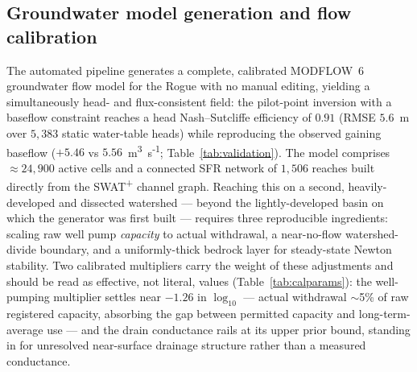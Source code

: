 \subsection{Groundwater model generation and flow calibration}
The automated pipeline generates a complete, calibrated MODFLOW~6 groundwater flow model for the
Rogue with no manual editing, yielding a simultaneously head- and flux-consistent field: the
pilot-point inversion with a baseflow constraint reaches a head Nash--Sutcliffe efficiency of
$\mathbf{0.91}$ (RMSE $5.6$~m over $5{,}383$ static water-table heads) while reproducing the observed
gaining baseflow ($+5.46$ vs $5.56$~m\textsuperscript{3}~s\textsuperscript{-1};
Table~\ref{tab:validation}). The model comprises $\approx 24{,}900$ active cells and a connected SFR
network of $1{,}506$ reaches built directly from the SWAT\textsuperscript{+} channel graph.
Reaching this on a second, heavily-developed and dissected watershed --- beyond the
lightly-developed basin on which the generator was first built --- requires three reproducible
ingredients: scaling raw well pump \emph{capacity} to actual withdrawal, a near-no-flow
watershed-divide boundary, and a uniformly-thick bedrock layer for steady-state Newton stability.
Two calibrated multipliers carry the weight of these adjustments and should be read as effective, not
literal, values (Table~\ref{tab:calparams}): the well-pumping multiplier settles near $-1.26$ in
$\log_{10}$ --- actual withdrawal $\sim$5\% of raw registered capacity, absorbing the gap between
permitted capacity and long-term-average use --- and the drain conductance rails at its upper prior
bound, standing in for unresolved near-surface drainage structure rather than a measured conductance.

